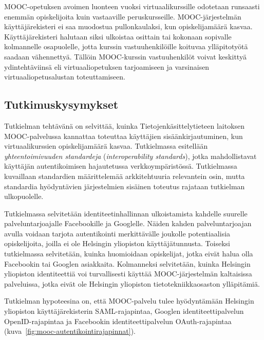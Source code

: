 \documentclass[finnish,gradu]{tktltiki}
\begin{document}
  MOOC-opetuksen avoimen luonteen vuoksi virtuaalikurssille odotetaan runsaasti enemmän opiskelijoita kuin vastaaville peruskursseille. MOOC-järjestelmän käyttäjärekisteri ei saa muodostua pullonkaulaksi, kun opiskelijamäärä kasvaa. Käyttäjärekisteri halutaan siksi ulkoistaa osittain tai kokonaan sopivalle kolmannelle osapuolelle, jotta kurssin vastuuhenkilöille koituvaa ylläpitotyötä saadaan vähennettyä. Tällöin MOOC-kurssin vastuuhenkilöt voivat keskittyä ydintehtäviinsä eli virtuaaliopetuksen tarjoamiseen ja varsinaisen virtuaaliopetusalustan toteuttamiseen.





\subsection{Tutkimuskysymykset} %
\label{sub:tutkimuskysymys}

Tutkielman tehtävänä on selvittää, kuinka Tietojenkäsittelytieteen laitoksen MOOC-palvelussa kannattaa toteuttaa käyttäjien sisäänkirjautuminen, kun virtuaalikurssien opiskelijamäärä kasvaa. Tutkielmassa esitellään \emph{yhteentoimivuuden standardeja} (\emph{interoperability standards}), jotka mahdollistavat käyttäjän autentikoimisen hajautetussa verkkoympäristössä. Tutkielmassa kuvaillaan standardien määrittelemää arkkitehtuuria relevantein osin, mutta standardia hyödyntävien järjestelmien sisäinen toteutus rajataan tutkielman ulkopuolelle.

Tutkielmassa selvitetään identiteetinhallinnan ulkoistamista kahdelle suurelle palveluntarjoajalle Facebookille ja Googlelle. Näiden kahden palveluntarjoajan avulla voidaan tarjota autentikointi merkittävälle joukolle potentiaalisia opiskelijoita, joilla ei ole Helsingin yliopiston käyttäjätunnusta. Toiseksi tutkielmassa selvitetään, kuinka huomioidaan opiskelijat, jotka eivät halua olla Facebookin tai Googlen asiakkaita. Kolmanneksi selvitetään, kuinka Helsingin yliopiston identiteettiä voi turvallisesti käyttää MOOC-järjestelmän kaltaisissa palveluissa, jotka eivät ole Helsingin yliopiston tietotekniikkaosaston ylläpitämiä.

Tutkielman hypoteesina on, että MOOC-palvelu tulee hyödyntämään Helsingin yliopiston käyttäjärekisterin SAML-rajapintaa, Googlen identiteettipalvelun OpenID-rajapintaa ja Facebookin identiteettipalvelun OAuth-rajapintaa (kuva~\ref{fig:mooc-autentikointirajapinnat}).
\end{document}
